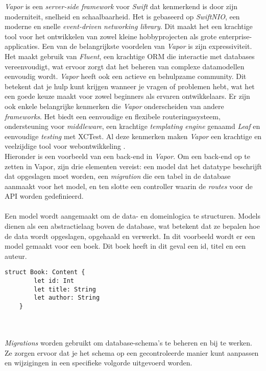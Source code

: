\textit{Vapor} is een \textit{server-side framework} voor \textit{Swift} dat kenmerkend is door zijn \\moderniteit, snelheid en schaalbaarheid. Het is gebaseerd op \textit{SwiftNIO}, een \\moderne en snelle \textit{event-driven networking library}. Dit maakt het een krachtige tool voor het ontwikkelen van zowel kleine hobbyprojecten als grote enterprise-applicaties. Een van de belangrijkste voordelen van \textit{Vapor} is zijn expressiviteit. Het maakt gebruik van \textit{Fluent}, een krachtige ORM die interactie met databases \\vereenvoudigt, wat ervoor zorgt dat het beheren van complexe datamodellen \\eenvoudig wordt. \textit{Vapor} heeft ook een actieve en behulpzame community. Dit \\betekent dat je hulp kunt krijgen wanneer je vragen of problemen hebt, wat het een goede keuze maakt voor zowel beginners als ervaren ontwikkelaars. Er zijn ook enkele belangrijke kenmerken die \textit{Vapor} onderscheiden van andere \textit{frameworks}. Het biedt een eenvoudige en flexibele routeringssysteem, ondersteuning voor \textit{middleware}, een krachtige \textit{templating engine} genaamd \textit{Leaf} en eenvoudige \textit{testing} met XCTest. Al deze kenmerken maken \textit{Vapor} een krachtige en veelzijdige tool voor webontwikkeling \autocite{Pant2023}.  \\
Hieronder is een voorbeeld van een back-end in \textit{Vapor}. Om een back-end op te zetten in Vapor, zijn drie elementen vereist: een model dat het datatype beschrijft dat opgeslagen moet worden, een \textit{migration} die een tabel in de database aanmaakt voor het model, en ten slotte een controller waarin de \textit{routes} voor de API worden gedefinieerd. 
 \\  \\
Een model wordt aangemaakt om de data- en domeinlogica te structuren. Models dienen als een abstractielaag boven de database, wat betekent dat ze bepalen hoe de data wordt opgeslagen, opgehaald en verwerkt. In dit voorbeeld wordt er een model gemaakt voor een boek. Dit boek heeft in dit geval een id, titel en een auteur. 

\begin{lstlisting}[caption=Vapor example - Model]
     struct Book: Content {
        let id: Int
        let title: String
        let author: String
    }
\end{lstlisting}
 \\  \\
 \textit{Migrations} worden gebruikt om database-schema's te beheren en bij te werken. Ze zorgen ervoor dat je het schema op een gecontroleerde manier kunt aanpassen en wijzigingen in een specifieke volgorde uitgevoerd worden. 

